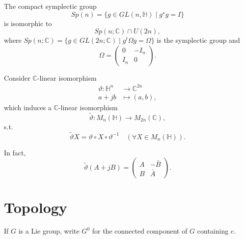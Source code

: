 \documentclass[11pt]{homework}
\begin{document}
\begin{proposition}
    The compact symplectic group
    \begin{equation*}
        Sp(n) = \{g \in GL(n,\mathbb{H}) \mid g^\star g=I\}
    \end{equation*}
    is isomorphic to 
    \begin{equation*}
        Sp(n;\mathbb{C}) \cap U(2n),
    \end{equation*}
    where $Sp(n;\mathbb{C}) = \{g \in GL(2n;\mathbb{C}) \mid g^t \Omega g = \Omega\}$ is the symplectic group and 
    \begin{equation*}
        \Omega = \begin{pmatrix}
            0 & -I_n \\ I_n & 0
        \end{pmatrix}.
    \end{equation*}
\end{proposition}

\begin{remark}
    Consider $\mathbb{C}$-linear isomorphism
    \begin{align*}
        \vartheta : \mathbb{H}^n & \rightarrow \mathbb{C}^{2n} \\
        a + j b & \mapsto (a, b),
    \end{align*}
    which induces a $\mathbb{C}$-linear isomorphism
    \begin{equation*}
        \tilde{\vartheta} : M_n (\mathbb{H}) \rightarrow M_{2n}(\mathbb{C}),
    \end{equation*}
    s.t.
    \begin{equation*}
        \tilde{\vartheta} X = \vartheta \circ X \circ \vartheta^{-1} \quad (\forall X \in M_n (\mathbb{H})).
    \end{equation*}

    In fact, 
    \begin{equation*}
        \tilde{\vartheta}(A + jB) = \begin{pmatrix}
            A & - \bar{B} \\ B & \bar{A}
        \end{pmatrix}.
    \end{equation*}
\end{remark}

\section*{Topology}

\begin{definition}
    If $G$ is a Lie group, write $G^{0}$ for the connected component of $G$ containing $e$.
\end{definition}
\end{document}
